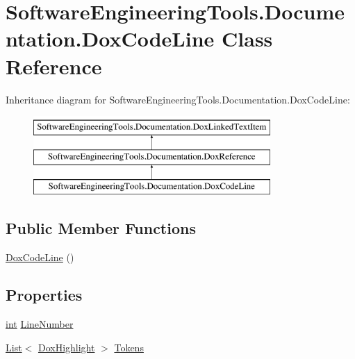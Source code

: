 \hypertarget{class_software_engineering_tools_1_1_documentation_1_1_dox_code_line}{\section{Software\+Engineering\+Tools.\+Documentation.\+Dox\+Code\+Line Class Reference}
\label{class_software_engineering_tools_1_1_documentation_1_1_dox_code_line}
}
Inheritance diagram for Software\+Engineering\+Tools.\+Documentation.\+Dox\+Code\+Line\+:\begin{figure}[H]
\begin{center}
\leavevmode
\includegraphics[height=3.000000cm]{class_software_engineering_tools_1_1_documentation_1_1_dox_code_line}
\end{center}
\end{figure}
\subsection*{Public Member Functions}
\begin{DoxyCompactItemize}
\item 
\hyperlink{class_software_engineering_tools_1_1_documentation_1_1_dox_code_line_aa54e6277a83e9fd9a74870e90a0d1130}{Dox\+Code\+Line} ()
\end{DoxyCompactItemize}
\subsection*{Properties}
\begin{DoxyCompactItemize}
\item 
\hyperlink{namespace_software_engineering_tools_1_1_documentation_a4a8017aa254d1d05b03db5132b7dd3a7afa7153f7ed1cb6c0fcf2ffb2fac21748}{int} \hyperlink{class_software_engineering_tools_1_1_documentation_1_1_dox_code_line_a2bd76e9ed3fa0de6f3e1b17024126d7e}{Line\+Number}
\item 
\hyperlink{namespace_software_engineering_tools_1_1_documentation_ae0bccf4f49a76db084c1c316e5954ec9a4ee29ca12c7d126654bd0e5275de6135}{List}$<$ \hyperlink{class_software_engineering_tools_1_1_documentation_1_1_dox_highlight}{Dox\+Highlight} $>$ \hyperlink{class_software_engineering_tools_1_1_documentation_1_1_dox_code_line_a6f991a58ace2ff0c216f0a8095081db0}{Tokens}
\end{DoxyCompactItemize}


